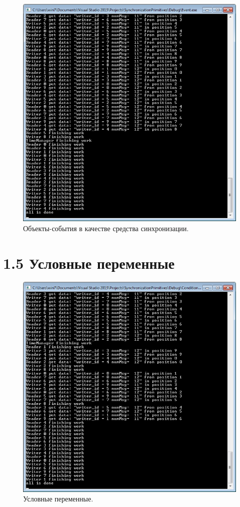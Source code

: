 \documentclass[a4paper,12pt]{article} %
\begin{document}
\begin{figure}[h!]
\centering
\includegraphics[scale=1]{res/004}
\caption{Объекты-события в качестве средства синхронизации.}
\end{figure}

\newpage

\section*{1.5 Условные переменные}

\begin{figure}[h!]
\centering
\includegraphics[scale=1]{res/005}
\caption{Условные переменные.}
\end{figure}
\end{document}
